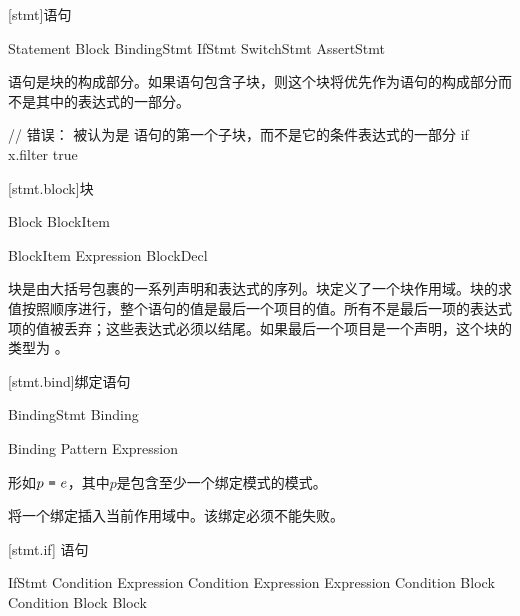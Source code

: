 
[stmt]{语句}

\begin{bnf}{Statement}
    Block \br
    BindingStmt \br
    IfStmt \br
    SwitchStmt \br
    AssertStmt
\end{bnf}

\pnum
语句是块的构成部分。如果语句包含子块，则这个块将优先作为语句的构成部分而不是其中的表达式的一部分。\enterexample

\begin{codeblock}
// 错误：  被认为是  语句的第一个子块，而不是它的条件表达式的一部分
if x.filter{ true }
\end{codeblock}

\exitexample

[stmt.block]{块}

\begin{bnf}{Block}
    \terminal{\{} BlockItem\bnfs\ \terminal{\}}
\end{bnf}

\begin{bnf}{BlockItem}
    Expression \terminal{;}\bnfq \br
    BlockDecl
\end{bnf}

\pnum
块是由大括号包裹的一系列声明和表达式的序列。块定义了一个块作用域。块的求值按照顺序进行，整个语句的值是最后一个项目的值。所有不是最后一项的表达式项的值被丢弃；这些表达式必须以\tcode{;}结尾。如果最后一个项目是一个声明，这个块的类型为 。

[stmt.bind]{绑定语句}

\begin{bnf}{BindingStmt}
    Binding \terminal{;}
\end{bnf}

\begin{bnf}{Binding}
    Pattern \terminal{=} Expression \terminal{;}
\end{bnf}

\pnum
{}形如$p\ \tcode{=}\ e$，其中$p$是包含至少一个绑定模式的模式。

\pnum
{}将一个绑定插入当前作用域中。该绑定必须不能失败。

[stmt.if]{ 语句}

\begin{bnf}{IfStmt}
     Condition  Expression \br
     Condition  Expression  Expression \br
     Condition Block \br
     Condition Block  Block
\end{bnf}

